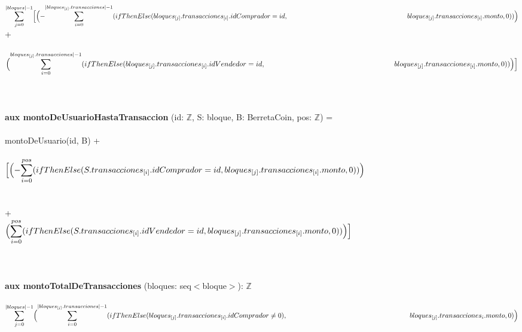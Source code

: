 \documentclass{article}
\newcommand{\Entero}{$\mathds{Z}$}
\begin{document}
        \indent\indent
        $\mathlarger\sum\limits_{j=0}^{|bloques| - 1}
        \Bigl[\Bigl(-\mathlarger\sum\limits_{i=0}^{|bloques_{[j]}.transacciones|-1} (ifThenElse (bloques_{[j]}.transacciones_{[i]}.idComprador = id,\\
        \indent\indent\indent\indent\indent\indent\indent\indent\indent\indent\indent\indent bloques_{[j]}.transacciones_{[i]}.monto, 0))\Bigr)$ \\

        \indent\indent\indent\indent\indent\indent\indent\indent+\\\\

        \indent\indent\indent\indent\indent
        $\Bigl(\mathlarger\sum\limits_{i=0}^{bloques_{[j]}.transacciones|-1} (ifThenElse (bloques_{[j]}.transacciones_{[i]}.idVendedor = id,\\
        \indent\indent\indent\indent\indent\indent\indent\indent\indent\indent\indent\indent bloques_{[j]}.transacciones_{[i]}.monto, 0))\Bigr)\Bigr]$\\\\\\\\

    \textbf{aux montoDeUsuarioHastaTransaccion} (id: \Entero, S: bloque, B: BerretaCoin, pos: \Entero) =\\\\
        \indent\indent montoDeUsuario(id, B) +\\\\
        \indent\indent $\Bigl[\Bigl(-\mathlarger\sum\limits_{i=0}^{pos} (ifThenElse (S.transacciones_{[i]}.idComprador = id, bloques_{[j]}.transacciones_{[i]}.monto, 0))\Bigr)$\\\\\\
        \indent\indent\indent+\\

        \indent\indent $\Bigl(\mathlarger\sum\limits_{i=0}^{pos} (ifThenElse (S.transacciones_{[i]}.idVendedor = id, bloques_{[j]}.transacciones_{[i]}.monto, 0)) \Bigr)\Bigr]$\\\\\\\\


    \textbf{aux montoTotalDeTransacciones} (bloques: seq$<$bloque$>$): \Entero\\\\
    \indent\indent $\mathlarger\sum\limits_{j=0}^{|bloques|-1} \Bigl(\mathlarger\sum\limits_{i=0}^{|bloques_{[j]}.transacciones|-1}
        (ifThenElse (bloques_{[j]}.transacciones_{[i]}.idComprador \ne 0),\\
        \indent\indent\indent\indent\indent\indent\indent\indent\indent\indent\indent\indent bloques_{[j]}.transacciones_{{i}}.monto, 0)\Bigr)$\\\\
\end{document}

